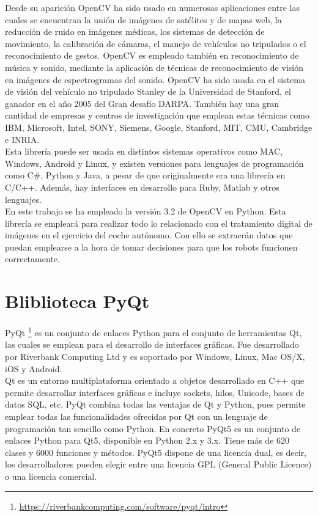 Desde su aparición OpenCV ha sido usado en numerosas aplicaciones entre las cuales se encuentran la unión de imágenes de satélites y de mapas web, la reducción de ruido en imágenes médicas, los sistemas de detección de movimiento, la calibración de cámaras, el manejo de vehículos no tripulados o el reconocimiento de gestos. OpenCV es empleado también en reconocimiento de música y sonido, mediante la aplicación de técnicas de reconocimiento de visión en imágenes de espectrogramas del sonido. OpenCV ha sido usada en el sistema de visión del vehículo no tripulado Stanley de la Universidad de Stanford, el ganador en el año 2005 del Gran desafío DARPA. También hay una gran cantidad de empresas y centros de investigación que emplean estas técnicas como IBM, Microsoft, Intel, SONY, Siemens, Google, Stanford, MIT, CMU, Cambridge e INRIA.\\

Esta librería puede ser usada en distintos sistemas operativos como MAC, Windows, Android y Linux, y existen versiones para lenguajes de programación como C\#, Python y Java, a pesar de que originalmente era una librería en C/C++. Además, hay interfaces en desarrollo para Ruby, Matlab y otros lenguajes.\\

En este trabajo se ha empleado la versión 3.2 de OpenCV en Python. Esta librería se empleará para realizar todo lo relacionado con el tratamiento digital de imágenes en el ejercicio del coche autónomo. Con ello se extraerán datos que puedan emplearse a la hora de tomar decisiones para que los robots funcionen correctamente.

\section{Bliblioteca PyQt}
PyQt \footnote{\url{https://riverbankcomputing.com/software/pyqt/intro}} es un conjunto de enlaces Python para el conjunto de herramientas Qt, las cuales se emplean para el desarrollo de interfaces gráficas. Fue desarrollado por Riverbank Computing Ltd y es soportado por Windows, Linux, Mac OS/X, iOS y Android.\\

Qt es un entorno multiplataforma orientado a objetos desarrollado en C++  que permite desarrollar interfaces gráficas e incluye sockets, hilos, Unicode, bases de datos SQL, etc. PyQt combina todas las ventajas de Qt y Python, pues permite emplear todas las funcionalidades ofrecidas por Qt con un lenguaje de programación tan sencillo como Python. En concreto PyQt5 es un conjunto de enlaces Python para Qt5, disponible en Python 2.x y 3.x. Tiene más de 620 clases y 6000 funciones y métodos. PyQt5 dispone de una licencia dual, es decir, los desarrolladores pueden elegir entre una licencia GPL (General Public Licence) o una licencia comercial.\\ 

